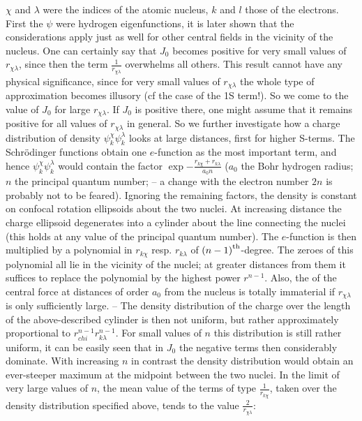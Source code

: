 \begin{paper}{1}
$\chi$ and $\lambda$ were the indices of the atomic nucleus, $k$ and $l$ those of the electrons. First the $\psi$ were hydrogen eigenfunctions, it is later shown that the considerations apply just as well for other central fields in the vicinity of the nucleus. One can certainly say that $J_0$ becomes positive for very small values of $r_{\chi\lambda}$, since then the term $\frac{1}{r_{\chi\lambda}}$ overwhelms all others. This result cannot have any physical significance, since for very small values of $r_{\chi\lambda}$ the whole type of approximation becomes illusory (cf the case of the 1S term!). So we come to the value of $J_0$ for large $r_{\chi\lambda}$. If $J_0$ is positive there, one might assume that it remains positive for all values of $r_{\chi\lambda}$ in general. So we further investigate how a charge distribution of density $\psi_k^\chi\psi_k^\lambda$ looks at large distances, first for higher S-terms. The Schr\"odinger functions obtain one $e$-function as the most important term, and hence $\psi_k^\chi\psi_k^\lambda$ would contain the factor $\exp{-\frac{r_{k\chi} + r_{k\lambda}}{a_0 n}}$ ($a_0$ the Bohr hydrogen radius; $n$ the principal quantum number; -- a change with the electron number $2n$ is probably not to be feared). Ignoring the remaining factors, the density is constant on confocal rotation ellipsoids about the two nuclei. At increasing distance the charge ellipsoid degenerates into a cylinder about the line connecting the nuclei (this holds at any value of the principal quantum number). The $e$-function is then multiplied by a polynomial in $r_{k\chi}$ resp. $r_{k\lambda}$ of ${(n-1)}^\text{th}$-degree. The zeroes of this polynomial all lie in the vicinity of the nuclei; at greater distances from them it suffices to replace the polynomial by the highest power $r^{n-1}$. Also, the  of the central force at distances of order $a_0$ from the nucleus is totally immaterial if $r_{\chi\lambda}$ is only sufficiently large. -- The density distribution of the charge over the length of the above-described cylinder is then not uniform, but rather approximately proportional to $r_{chi}^{n-1} r_{k\lambda}^{n-1}$. For small values of $n$ this distribution is still rather uniform, it can be easily seen that in $J_0$ the negative terms then considerably dominate. With increasing $n$ in contrast the density distribution would obtain an ever-steeper maximum at the midpoint between the two nuclei. In the limit of very large values of $n$, the mean value of the terms of type $\frac{1}{r_{k\chi}}$, taken over the density distribution specified above, tends to the value $\frac{2}{r_{\chi\lambda}}$:

\end{paper}
